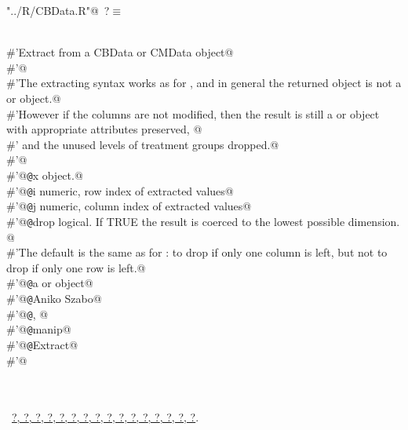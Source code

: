 \documentclass[reqno]{amsart}
\renewcommand{\NWtarget}[2]{\hypertarget{#1}{#2}}
\renewcommand{\NWlink}[2]{\hyperlink{#1}{#2}}
\begin{document}
\begin{flushleft} \small
\begin{minipage}{\linewidth}\label{scrap6}\raggedright\small
\NWtarget{nuweb?}{} \verb@"../R/CBData.R"@\nobreak\ {\footnotesize {?}}$\equiv$
\vspace{-1ex}
\begin{list}{}{} \item
\mbox{}\verb@@\\
\mbox{}\verb@#'Extract from a CBData or CMData object@\\
\mbox{}\verb@#'@\\
\mbox{}\verb@#'The extracting syntax works as for \code{\link{[.data.frame}}, and in general the returned object is not a  or  object.@\\
\mbox{}\verb@#'However if the columns are not modified, then the result is still a  or  object  with appropriate attributes  preserved, @\\
\mbox{}\verb@#' and the unused levels of treatment groups dropped.@\\
\mbox{}\verb@#'@\\
\mbox{}\verb@#'@{\tt @}\verb@param x  object.@\\
\mbox{}\verb@#'@{\tt @}\verb@param i numeric, row index of extracted values@\\
\mbox{}\verb@#'@{\tt @}\verb@param j numeric, column index of extracted values@\\
\mbox{}\verb@#'@{\tt @}\verb@param drop logical. If TRUE the result is coerced to the lowest possible dimension. @\\
\mbox{}\verb@#'The default is the same as for \code{\link{[.data.frame}}: to drop if only one column is left, but not to drop if only one row is left.@\\
\mbox{}\verb@#'@{\tt @}\verb@return a  or  object@\\
\mbox{}\verb@#'@{\tt @}\verb@author Aniko Szabo@\\
\mbox{}\verb@#'@{\tt @}\verb@seealso {}, @\\
\mbox{}\verb@#'@{\tt @}\verb@keywords manip@\\
\mbox{}\verb@#'@{\tt @}\verb@name Extract@\\
\mbox{}\verb@#'@\\
\mbox{}\verb@NULL@\\
\mbox{}\verb@@\\
\mbox{}\verb@@{\NWsep}
\end{list}
\vspace{-1.5ex}
\footnotesize
\begin{list}{}{\setlength{\itemsep}{-\parsep}\setlength{\itemindent}{-\leftmargin}}
\item \NWtxtFileDefBy\ \NWlink{nuweb?}{?}\NWlink{nuweb?}{, ?}\NWlink{nuweb?}{, ?}\NWlink{nuweb?}{, ?}\NWlink{nuweb?}{, ?}\NWlink{nuweb?}{, ?}\NWlink{nuweb?}{, ?}\NWlink{nuweb?}{, ?}\NWlink{nuweb?}{, ?}\NWlink{nuweb?}{, ?}\NWlink{nuweb?}{, ?}\NWlink{nuweb?}{, ?}\NWlink{nuweb?}{, ?}\NWlink{nuweb?}{, ?}\NWlink{nuweb?}{, ?}\NWlink{nuweb?}{, ?}.


\end{list}
\end{minipage}
\end{flushleft}
\end{document}
